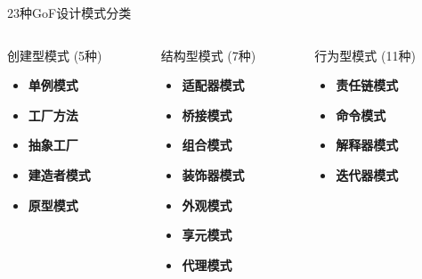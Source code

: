 \documentclass[UTF8,aspectratio=169]{beamer}
\begin{document}
\begin{frame}{23种GoF设计模式分类}
    \begin{columns}
        \begin{column}{0.32\textwidth}
            \begin{ytublock}{创建型模式 (5种)}
                \begin{itemize}
                    \item \textbf{单例模式}
                    \item \textbf{工厂方法}
                    \item \textbf{抽象工厂}
                    \item \textbf{建造者模式}
                    \item \textbf{原型模式}
                \end{itemize}
            \end{ytublock}
        \end{column}
        \begin{column}{0.32\textwidth}
            \begin{ytublock}{结构型模式 (7种)}
                \begin{itemize}
                    \item \textbf{适配器模式}
                    \item \textbf{桥接模式}
                    \item \textbf{组合模式}
                    \item \textbf{装饰器模式}
                    \item \textbf{外观模式}
                    \item \textbf{享元模式}
                    \item \textbf{代理模式}
                \end{itemize}
            \end{ytublock}
        \end{column}
        \begin{column}{0.32\textwidth}
            \begin{ytublock}{行为型模式 (11种)}
                \begin{itemize}
                    \item \textbf{责任链模式}
                    \item \textbf{命令模式}
                    \item \textbf{解释器模式}
                    \item \textbf{迭代器模式}

\end{itemize}
\end{ytublock}
\end{column}
\end{columns}
\end{frame}
\end{document}
